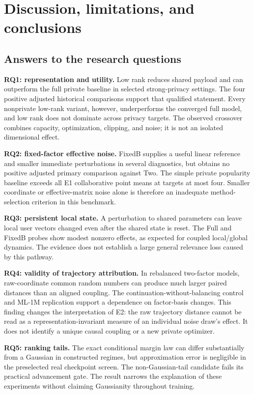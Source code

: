 \section{Discussion, limitations, and conclusions}
\label{sec:discussion}
\subsection{Answers to the research questions}
\textbf{RQ1: representation and utility.} Low rank reduces shared payload and
can outperform the full private baseline in selected strong-privacy settings.
The four positive adjusted historical comparisons support that qualified
statement. Every nonprivate low-rank variant, however, underperforms the
converged full model, and low rank does not dominate across privacy targets.
The observed crossover combines capacity, optimization, clipping, and noise;
it is not an isolated dimensional effect.

\textbf{RQ2: fixed-factor effective noise.} FixedB supplies a useful linear
reference and smaller immediate perturbations in several diagnostics, but
obtains no positive adjusted primary comparison against Two. The simple
private popularity baseline exceeds all E1 collaborative point means at
targets at most four. Smaller coordinate or effective-matrix noise alone is
therefore an inadequate method-selection criterion in this benchmark.

\textbf{RQ3: persistent local state.} A perturbation to shared parameters can
leave local user vectors changed even after the shared state is reset. The
Full and FixedB probes show modest nonzero effects, as expected for coupled
local/global dynamics. The evidence does not establish a large general
relevance loss caused by this pathway.

\textbf{RQ4: validity of trajectory attribution.} In rebalanced two-factor
models, raw-coordinate common random numbers can produce much larger paired
distances than an aligned coupling. The continuation-without-balancing
control and ML-1M replication support a dependence on factor-basis changes.
This finding changes the interpretation of E2: the raw trajectory distance
cannot be read as a representation-invariant measure of an individual
noise draw's effect. It does not identify a unique causal coupling or a
new private optimizer.

\textbf{RQ5: ranking tails.} The exact conditional margin law can differ
substantially from a Gaussian in constructed regimes, but approximation
error is negligible in the preselected real checkpoint screen. The
non-Gaussian-tail candidate fails its practical advancement gate. The
result narrows the explanation of these experiments without claiming
Gaussianity throughout training.

